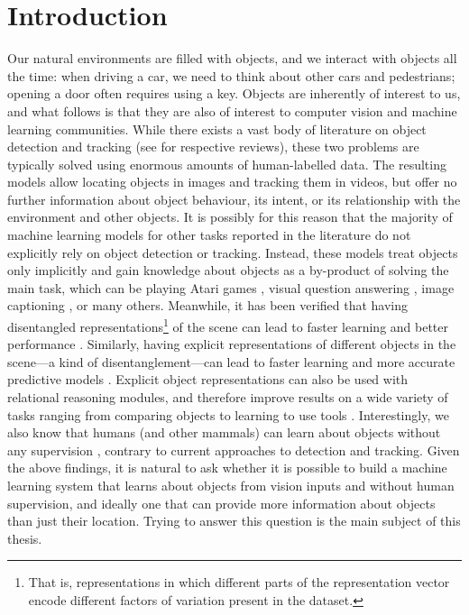 \chapter{Introduction}
\label{ch:introduction}
%

	Our natural environments are filled with objects, and we interact with objects all the time: when driving a car, we need to think about other cars and pedestrians; opening a door often requires using a key.
	Objects are inherently of interest to us, and what follows is that they are also of interest to computer vision and machine learning communities.
	While there exists a vast body of literature on object detection and tracking (see\eg \cite{Liu2018deepod,Ciaparrone2019deepmot} for respective reviews), these two problems are typically solved using enormous amounts of human-labelled data. 
	The resulting models allow locating objects in images and tracking them in videos, but offer no further information about object behaviour, its intent, or its relationship with the environment and other objects.
	It is possibly for this reason that the majority of machine learning models for other tasks reported in the literature do not explicitly rely on object detection or tracking.
	Instead, these models treat objects only implicitly and gain knowledge about objects as a by-product of solving the main task, which can be playing Atari games \citep{Mnih2013dqn}, visual question answering \citep{Malinowski2015vqn}, image captioning \citep{Xu2015show}, or many others.
	Meanwhile, it has been verified that having disentangled representations\footnote{That is, representations in which different parts of the representation vector encode different factors of variation present in the dataset.} of the scene can lead to faster learning and better performance \citep{Steenkiste2019disentangled}.
	Similarly, having explicit representations of different objects in the scene---a kind of disentanglement---can lead to faster learning and more accurate predictive models \citep{Veerapaneni2019op3}. 
 	Explicit object representations can also be used with relational reasoning modules, and therefore improve results on a wide variety of tasks ranging from comparing objects \citep{Santoro2017} to learning to use tools \citep{Baker2019tooluse}.
 	Interestingly, we also know that humans (and other mammals) can learn about objects without any supervision \citep{Lambert2017cows}, contrary to current approaches to detection and tracking.
 	Given the above findings, it is natural to ask whether it is possible to build a machine learning system that learns about objects from vision inputs and without human supervision, and ideally one that can provide more information about objects than just their location.
 	Trying to answer this question is the main subject of this thesis.
 
